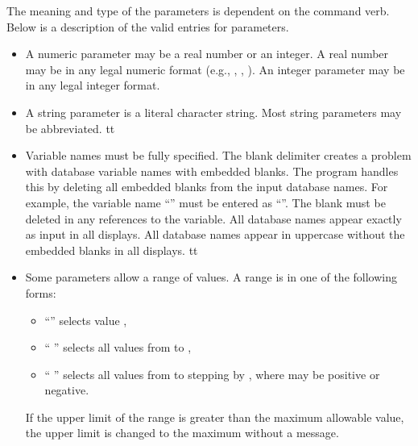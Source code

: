 The meaning and type of the parameters is dependent on the command verb.
Below is a description of the valid entries for parameters. 
\setlength{\itemsep}{\medskipamount} \begin{itemize}
%
\item
A numeric parameter may be a real number or an integer. A real number
may be in any legal  numeric format (e.g., ,
, ). An integer parameter may be in any legal
integer format.
\item
A string parameter is a literal character string. Most string parameters
may be abbreviated.
%
\newcommand{\okname}{f}
\ifx\PROGRAM\BLOT \renewcommand{\okname}{t} \fi
\ifx\PROGRAM\ALGEBRA \renewcommand{\okname}{t} \fi
\ifx\PROGRAM\EXPLORE \renewcommand{\okname}{t} \fi
\if\okname t
\item
Variable names must be fully specified. The blank delimiter creates a
problem with database variable names with embedded blanks. The program
handles this by deleting all embedded blanks from the input database
names. For example, the variable name ``'' must be entered as
``''. The blank must be deleted in any references to the
variable.
\ifx\PROGRAM\EXPLORE
All database names appear exactly as input in all displays.
\else
All database names appear in uppercase without the embedded blanks in
all displays.
\fi
\fi
\newcommand{\okrange}{f}
\ifx\PROGRAM\BLOT \renewcommand{\okrange}{t} \fi
\ifx\PROGRAM\EXPLORE \renewcommand{\okrange}{t} \fi
\ifx\PROGRAM\NUMBERS \renewcommand{\okrange}{t} \fi
\if\okrange t
\item
Some parameters allow a range of values. A range is in one of the
following forms:
\setlength{\itemsep}{\medskipamount} \begin{itemize}
\item ``'' selects value ,
\item ``  '' selects all values from
 to ,
\item ``    ''
selects all values from  to  stepping by
, where  may be positive or negative.
\end{itemize}
If the upper limit of the range is greater than the maximum allowable
value, the upper limit is changed to the maximum without a message.
\fi
\end{itemize}

